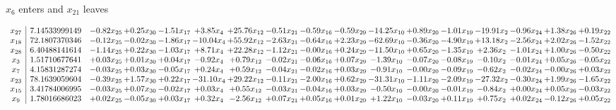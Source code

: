 \documentclass[9pt]{article}
\begin{document}
 $ x_{6} $ enters and $ x_{21} $ leaves 

 \[\begin{array}{c| c c@{\hskip 2pt} c@{\hskip 2pt} c@{\hskip 2pt} c@{\hskip 2pt} c@{\hskip 2pt} c@{\hskip 2pt} c@{\hskip 2pt} c@{\hskip 2pt} c@{\hskip 2pt} c@{\hskip 2pt} c@{\hskip 2pt} c@{\hskip 2pt} c@{\hskip 2pt} c@{\hskip 2pt} c@{\hskip 2pt} }
 x_{27}   &  7.14533999149 & -0.82 x_{25} & +  0.25 x_{30} & -1.51 x_{17} & +  3.85 x_{4} & + 25.76 x_{12} & -0.51 x_{21} & -0.59 x_{16} & -0.59 x_{29} & -14.25 x_{10} & +  0.89 x_{20} & -1.01 x_{19} & -19.91 x_{2} & -0.96 x_{24} & +  1.38 x_{26} & +  0.19 x_{22}\\
 x_{18}   &  72.1807370346 & -0.12 x_{25} & -0.02 x_{30} & -1.86 x_{17} & -10.04 x_{4} & + 55.92 x_{12} & -2.63 x_{21} & -0.64 x_{16} & +  2.23 x_{29} & -62.69 x_{10} & -0.36 x_{20} & -4.90 x_{19} & + 13.18 x_{2} & -2.56 x_{24} & +  2.02 x_{26} & -1.52 x_{22}\\
 x_{28}   &  6.40488141614 & -1.14 x_{25} & +  0.22 x_{30} & -1.03 x_{17} & +  8.71 x_{4} & + 22.28 x_{12} & -1.12 x_{21} & -0.00 x_{16} & +  0.24 x_{29} & -11.50 x_{10} & +  0.65 x_{20} & -1.35 x_{19} & +  2.36 x_{2} & -1.01 x_{24} & +  1.00 x_{26} & -0.50 x_{22}\\
 x_{3}   &  1.51710677641 & +  0.03 x_{25} & +  0.01 x_{30} & +  0.04 x_{17} & -0.92 x_{4} & +  0.79 x_{12} & -0.02 x_{21} & -0.06 x_{16} & +  0.07 x_{29} & -1.39 x_{10} & -0.07 x_{20} & -0.08 x_{19} & -0.10 x_{2} & -0.01 x_{24} & +  0.05 x_{26} & -0.05 x_{22}\\
 x_{7}   &  4.15831287274 & -0.03 x_{25} & +  0.03 x_{30} & -0.05 x_{17} & +  0.24 x_{4} & +  0.59 x_{12} & -0.04 x_{21} & -0.02 x_{16} & +  0.03 x_{29} & -0.91 x_{10} & -0.00 x_{20} & -0.09 x_{19} & -0.62 x_{2} & -0.02 x_{24} & -0.00 x_{26} & +  0.03 x_{22}\\
 x_{23}   &  78.1639059604 & -0.39 x_{25} & +  1.57 x_{30} & +  0.22 x_{17} & -31.10 x_{4} & + 29.22 x_{12} & -0.11 x_{21} & -2.00 x_{16} & +  0.62 x_{29} & -31.31 x_{10} & -1.11 x_{20} & -2.09 x_{19} & -27.32 x_{2} & -0.30 x_{24} & +  1.99 x_{26} & -1.65 x_{22}\\
 x_{15}   &  3.41784006995 & -0.03 x_{25} & +  0.07 x_{30} & -0.02 x_{17} & +  0.03 x_{4} & +  0.55 x_{12} & -0.03 x_{21} & -0.04 x_{16} & +  0.03 x_{29} & -0.50 x_{10} & -0.00 x_{20} & -0.01 x_{19} & -0.84 x_{2} & +  0.00 x_{24} & +  0.05 x_{26} & -0.03 x_{22}\\
 x_{9}   &  1.78016686023 & +  0.02 x_{25} & -0.05 x_{30} & +  0.03 x_{17} & +  0.32 x_{4} & -2.56 x_{12} & +  0.07 x_{21} & +  0.05 x_{16} & +  0.01 x_{29} & +  1.22 x_{10} & -0.03 x_{20} & +  0.11 x_{19} & +  0.75 x_{2} & +  0.02 x_{24} & -0.12 x_{26} & +  0.05 x_{22}\\

\end{array}\]
\end{document}
